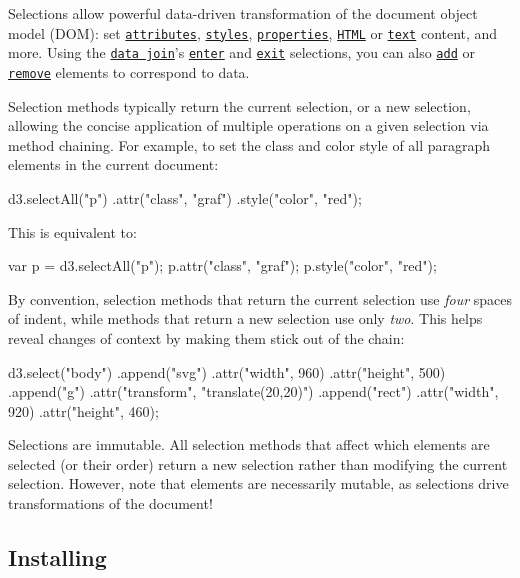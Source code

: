 Selections allow powerful data-\/driven transformation of the document object model (D\+OM)\+: set \href{#selection_attr}{\tt attributes}, \href{#selection_style}{\tt styles}, \href{#selection_property}{\tt properties}, \href{#selection_html}{\tt H\+T\+ML} or \href{#selection_text}{\tt text} content, and more. Using the \href{#joining-data}{\tt data join}’s \href{#selection_enter}{\tt enter} and \href{#selection_enter}{\tt exit} selections, you can also \href{#selection_append}{\tt add} or \href{#selection_remove}{\tt remove} elements to correspond to data.

Selection methods typically return the current selection, or a new selection, allowing the concise application of multiple operations on a given selection via method chaining. For example, to set the class and color style of all paragraph elements in the current document\+:


\begin{DoxyCode}
d3.selectAll("p")
    .attr("class", "graf")
    .style("color", "red");
\end{DoxyCode}


This is equivalent to\+:


\begin{DoxyCode}
var p = d3.selectAll("p");
p.attr("class", "graf");
p.style("color", "red");
\end{DoxyCode}


By convention, selection methods that return the current selection use {\itshape four} spaces of indent, while methods that return a new selection use only {\itshape two}. This helps reveal changes of context by making them stick out of the chain\+:


\begin{DoxyCode}
d3.select("body")
  .append("svg")
    .attr("width", 960)
    .attr("height", 500)
  .append("g")
    .attr("transform", "translate(20,20)")
  .append("rect")
    .attr("width", 920)
    .attr("height", 460);
\end{DoxyCode}


Selections are immutable. All selection methods that affect which elements are selected (or their order) return a new selection rather than modifying the current selection. However, note that elements are necessarily mutable, as selections drive transformations of the document!

\subsection*{Installing}

